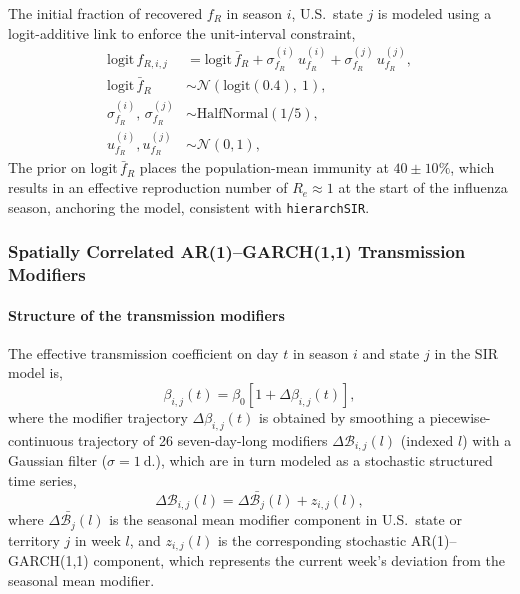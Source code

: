 \documentclass[11pt]{article}
\newcommand{\Normal}{\mathcal{N}}
\newcommand{\HalfNormal}{\text{HalfNormal}}
\begin{document}
The initial fraction of recovered $f_R$ in season $i$, U.S.\ state $j$ is modeled using a logit-additive link to enforce the unit-interval constraint,
\begin{align}\label{eq:f_R}
	\text{logit}\,f_{R,i,j} &= \text{logit}\,\bar{f}_R + \sigma^{(i)}_{f_R}\, u^{(i)}_{f_R} + \sigma^{(j)}_{f_R}\, u^{(j)}_{f_R}, \nonumber\\
    \text{logit}\,\bar{f}_R &\sim \Normal\!\left(\text{logit}(0.4),\ 1\right), \nonumber\\
    \sigma^{(i)}_{f_R},\, \sigma^{(j)}_{f_R} &\sim \HalfNormal\!\left(1/5\right), \nonumber\\
    u^{(i)}_{f_R}, u^{(j)}_{f_R} &\sim \Normal(0,1),
\end{align}
The prior on $\text{logit}\,\bar{f}_R$ places the population-mean immunity at $40\pm10\%$, which results in an effective reproduction number of $R_e \approx 1$ at the start of the influenza season, anchoring the model, consistent with \texttt{hierarchSIR}.

\subsubsection*{Spatially Correlated AR(1)--GARCH(1,1) Transmission Modifiers}\label{sec:argarch}

\paragraph{Structure of the transmission modifiers} The effective transmission coefficient on day $t$ in season $i$ and state $j$ in the SIR model is,
\begin{equation}
\beta_{i,j}(t) = \beta_0 \left[ 1 + \Delta \beta_{i,j}(t) \right],
\end{equation}
where the modifier trajectory $\Delta \beta_{i,j}(t)$ is obtained by smoothing a piecewise-continuous trajectory of 26 seven-day-long modifiers $\Delta \mathcal{B}_{i,j}(l)$ (indexed $l$) with a Gaussian filter ($\sigma = 1~\text{d.}$), which are in turn modeled as a stochastic structured time series,
\begin{equation}
    \Delta \mathcal{B}_{i,j} (l) = \Delta\bar{\mathcal{B}_{j}}(l) + z_{i,j}(l),
\end{equation}
where $\Delta\bar{\mathcal{B}_{j}}(l)$ is the seasonal mean modifier component in U.S.\ state or territory $j$ in week $l$, and $z_{i,j}(l)$ is the corresponding stochastic AR(1)--GARCH(1,1) component, which represents the current week's deviation from the seasonal mean modifier.
\end{document}
